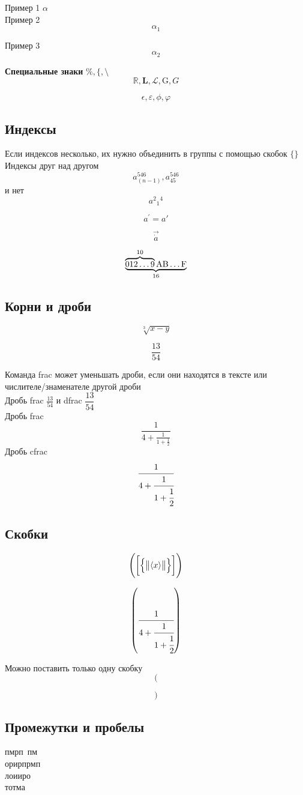 \documentclass[12pt]{article}
\begin{document}
Пример 1 $\alpha$\\ %
Пример 2 $$\alpha_1$$ %

Пример 3 \[\alpha_2\] %

\textbf{Специальные знаки} $\%, \{, \setminus$\\

$$\mathbb  R, \mathbf L, \mathcal L, \mathrm G, G$$

$$\epsilon, \varepsilon, \phi, \varphi$$

\subsection{Индексы}
Если индексов несколько, их нужно объединить в группы с помощью скобок $\{\}$\\
Индексы друг над другом
$$a_{(n-1)}^{546}, a^{546}_{45}$$
и нет
$$a^2{}_1{}^4$$

$$a^\prime=a'$$

$$\vec{\dot a}$$

$$\underbrace{
\overbrace{0 1 2 \dots 9}^{10}
\rm A B \dots F
}_{16}$$

\subsection{Корни и дроби}

$$\sqrt[3]{x-y}$$

$$\frac{13}{54}$$

Команда frac может уменьшать дроби, если они находятся в тексте или числителе/знаменателе другой дроби\\
Дробь frac $\frac{13}{54}$ и dfrac $\dfrac{13}{54}$\\
Дробь frac
$$\frac{1}{4+\frac1{1+\frac12}}$$
Дробь cfrac
$$\cfrac{1}{4+\cfrac1{1+\cfrac12}}$$

\subsection{Скобки}

$$\Biggl(
\biggl[
\Bigl\{
\bigl\|
\langle x \rangle
\bigr\|
\Bigr\}
\biggr]
\Biggr)$$

$$\left(\cfrac{1}{4+\cfrac1{1+\cfrac12}}\right)$$ 

Можно поставить только одну скобку
$$\biggl($$

$$\left. \right)$$

\subsection{Промежутки и пробелы}
пмрп \,пм\\
орир\:прмп\\
лои\;иро\\
тот\qquad ма \\
\end{document}
